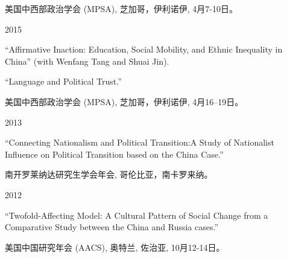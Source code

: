 \documentclass[10.5pt,]{article}
\providecommand{\tightlist}{%
  \setlength{\itemsep}{0pt}\setlength{\parskip}{0pt}}
\renewenvironment{itemize}{
  \begin{list}{}{
    \setlength{\leftmargin}{1.5em}
  }
}{
  \end{list}
}
\begin{document}
\begin{itemize}
\begin{itemize}
    \begin{itemize}
    \tightlist
    \item
      \footnotesize 美国中西部政治学会 (MPSA), 芝加哥，伊利诺伊,
      4月7-10日。
    \end{itemize}
  \end{itemize}
\item
  2015

  \begin{itemize}
  \tightlist
  \item
    ``Affirmative Inaction: Education, Social Mobility, and Ethnic
    Inequality in China'' (with Wenfang Tang and Shuai Jin).
  \item
    ``Language and Political Trust.''

    \begin{itemize}
    \tightlist
    \item
      \footnotesize 美国中西部政治学会 (MPSA), 芝加哥，伊利诺伊,
      4月16--19日。
    \end{itemize}
  \end{itemize}
\item
  2013

  \begin{itemize}
  \tightlist
  \item
    ``Connecting Nationalism and Political Transition:A Study of
    Nationalist Influence on Political Transition based on the China
    Case.''

    \begin{itemize}
    \tightlist
    \item
      \footnotesize 南开罗莱纳达研究生学会年会, 哥伦比亚，南卡罗来纳。
    \end{itemize}
  \end{itemize}
\item
  2012

  \begin{itemize}
  \tightlist
  \item
    ``Twofold-Affecting Model: A Cultural Pattern of Social Change from
    a Comparative Study between the China and Russia cases.''

    \begin{itemize}
    \tightlist
    \item
      \footnotesize 美国中国研究年会 (AACS), 奥特兰, 佐治亚,
      10月12-14日。
    \end{itemize}
  \end{itemize}
\end{itemize}
\end{document}
